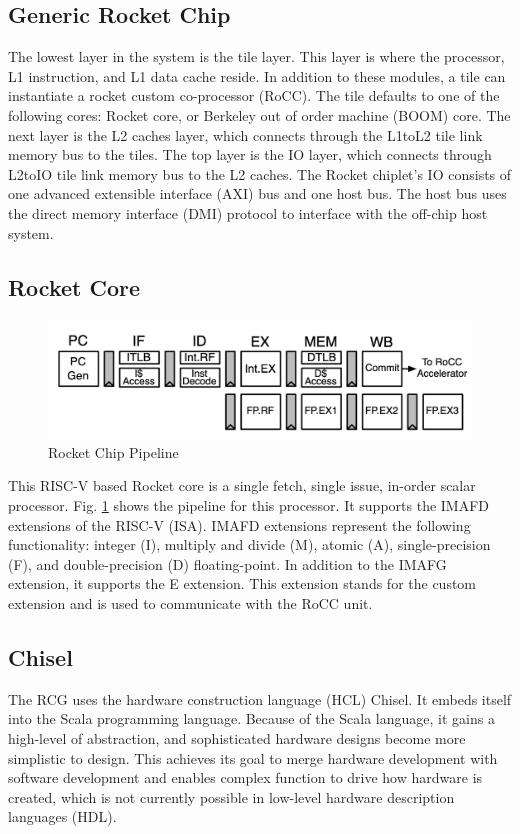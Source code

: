 \documentclass[../main.tex]{subfiles}
\begin{document}
\subsection{Generic Rocket Chip}
The lowest layer in the system is the tile layer. This layer is where the processor,  L1 instruction, and L1 data cache reside. In addition to these modules, a tile can instantiate a rocket custom co-processor (RoCC).  The tile defaults to one of the following cores: Rocket core, or Berkeley out of order machine (BOOM) core.  The next layer is the L2 caches layer, which connects through the L1toL2 tile link memory bus to the tiles. The top layer is the IO layer, which connects through L2toIO tile link memory bus to the L2 caches. The Rocket chiplet's IO consists of one advanced extensible interface (AXI) bus and one host bus. The host bus uses the direct memory interface (DMI) protocol to interface with the off-chip host system. 


\subsection{Rocket Core}
\begin{figure}
    \centering
    \includegraphics[scale=.35]{pngs/RocketPipeline.png}
    \caption{Rocket Chip Pipeline\cite{Asanović:EECS-2016-17}}
    \label{fig:RocketCipFlow}
\end{figure}
This RISC-V based Rocket core is a single fetch, single issue, in-order scalar processor. Fig. \ref{fig:RocketCipFlow} shows the pipeline for this processor. It supports the IMAFD extensions of the RISC-V (ISA)\cite{RISC-V-isa}. IMAFD extensions represent the following functionality: integer (I), multiply and divide (M), atomic (A), single-precision (F), and double-precision (D) floating-point\cite{RISC-V-isa}. In addition to the IMAFG extension, it supports the E extension\cite{RISC-V-isa}. This extension stands for the custom extension and is used to communicate with the RoCC unit.

\subsection{Chisel}
The RCG uses the hardware construction language (HCL) Chisel\cite{chisel:book}. It embeds itself into the Scala programming language. Because of the Scala language, it gains a high-level of abstraction, and sophisticated hardware designs become more simplistic to design\cite{chisel:book}. This achieves its goal to merge hardware development with software development and enables complex function to drive how hardware is created, which is not currently possible in low-level hardware description languages (HDL)\cite{chisel:book}.
\end{document}
